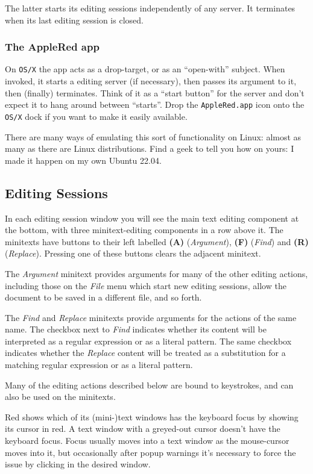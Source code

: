 \documentclass[12pt,a4paper]{article}
\begin{document}
The latter starts its editing sessions independently of any server. It
terminates when its last editing session is closed.

\subsubsection{The AppleRed app}\label{theappleredapp}
On \texttt{OS/X} the app acts as a drop-target, or as an ``open-with''
subject. When invoked, it starts a editing server (if necessary), then
passes its argument to it, then (finally) terminates. Think of it as a
``start button'' for the server and don't expect it to hang around
between ``starts''. Drop the \texttt{AppleRed.app} icon onto the
\texttt{OS/X} dock if you want to make it easily available.

There are many ways of emulating this sort of functionality on
Linux: almost as many as there are Linux distributions. Find a
geek to tell you how on yours: I made it happen on my own Ubuntu 22.04.

\hypertarget{editing-sessions}{%
\subsection{Editing Sessions}\label{editing-sessions}}

In each editing session window you will see the main text editing
component at the bottom, with three minitext-editing components in a row
above it. The minitexts have buttons to their left labelled \textbf{(A)}
(\emph{Argument}), \textbf{(F)} (\emph{Find}) and \textbf{(R)}
(\emph{Replace}). Pressing one of these buttons clears the adjacent
minitext.

The \emph{Argument} minitext provides arguments for many of the other
editing actions, including those on the \emph{File} menu which start new
editing sessions, allow the document to be saved in a different file,
and so forth.

The \emph{Find} and \emph{Replace} minitexts provide arguments for the
actions of the same name. The checkbox next to \emph{Find} indicates
whether its content will be interpreted as a regular expression or as a
literal pattern. The same checkbox indicates whether the \emph{Replace}
content will be treated as a substitution for a matching regular
expression or as a literal pattern.

Many of the editing actions described below are bound to keystrokes, and
can also be used on the minitexts.

Red shows which of its (mini-)text windows has the keyboard focus by
showing its cursor in red. A text window with a greyed-out cursor
doesn't have the keyboard focus. Focus usually moves into a text window
as the mouse-cursor moves into it, but occasionally after popup warnings
it's necessary to force the issue by clicking in the desired window.
\end{document}
